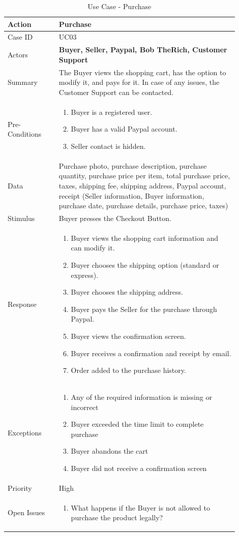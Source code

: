 \documentclass[11pt]{article}
\newcounter{use case ID}
\newcommand\tabularhead[1]{
    \begin{table}[ht]
        \addtocounter{use case ID}{1}
        \caption{Use Case \arabic{use case ID} - #1}
        \vspace{0.2cm}
        \begin{tabular}{|p{0.2\linewidth}|p{0.70\linewidth}|}
            \hline
            \textbf{Action} & \textbf{#1} \\
            \hline}
\newcommand\addrow[2]{#1 & #2\\ \hline}
\newcommand\addmulrow[2]{ \begin{minipage}[t][][t]{2.5cm}#1\end{minipage}
                &\begin{minipage}[t][][t]{11cm}
                    \begin{enumerate}[itemsep=-1ex] #2   \end{enumerate}
                \end{minipage}\vfill\\ \hline}
\newenvironment{usecase}{\tabularhead}
        {\hline\end{tabular}\end{table}}
\newcounter{req ID}
\begin{document}
\begin{usecase}{Purchase}
    \addrow{Case ID}{UC03}
    \addrow{Actors}{\textbf{Buyer, Seller, Paypal, Bob TheRich, Customer Support}}
    \addrow{Summary}{The Buyer views the shopping cart, has the option to modify it, and pays for it. In case of any issues, the Customer Support can be contacted.}
    \addmulrow{Pre-Conditions}{
        \item Buyer is a registered user.
        \item Buyer has a valid Paypal account. 
        \item Seller contact is hidden.
    }
    \addrow{Data}{Purchase photo, purchase description, purchase quantity, purchase price per item, total purchase price, taxes, shipping fee, shipping address, Paypal account, receipt (Seller information, Buyer information, purchase date, purchase details, purchase price, taxes)}
    \addrow{Stimulus}{Buyer presses the Checkout Button.}
    \addmulrow{Response}{
            \item Buyer views the shopping cart information and can modify it.
            \item Buyer chooses the shipping option (standard or express).
            \item Buyer chooses the shipping address.
            \item Buyer pays the Seller for the purchase through Paypal.
            \item Buyer views the confirmation screen.  
            \item Buyer receives a confirmation and receipt by email.
            \item Order added to the purchase history.
    }
    \addmulrow{Exceptions}{
        \item Any of the required information is missing or incorrect
        \item Buyer exceeded the time limit to complete purchase
        \item Buyer abandons the cart
        \item Buyer did not receive a confirmation screen
    }
    \addrow{Priority}{High}
    \addmulrow{Open Issues}{
        \item What happens if the Buyer is not allowed to purchase the product legally?
    } 
    
\end{usecase}
\end{document}
